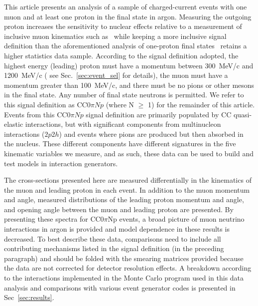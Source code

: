 \documentclass[%
twocolumn,
 amsmath,amssymb,
 aps,
prd,
superscriptaddress,showpacs]{revtex4-2}
\begin{document}
This article presents an analysis of a sample of charged-current events with one muon and at least one proton in the final state in argon.
Measuring the outgoing proton increases the sensitivity to nuclear effects relative to a measurement of inclusive muon kinematics such as~\cite{Adams:2019iqcINCL} while keeping a more inclusive signal definition than the aforementioned analysis of one-proton final states~\cite{uB_CCQE_2020} retains a higher statistics data sample. According to the signal definition adopted, the highest energy (leading) proton must have a momentum between 300~MeV/c and 1200~MeV/c (
see Sec.~\ref{sec:event_sel} for details), the muon must have a momentum greater than 100~MeV/c, and there must be no pions or other mesons in the final state.
Any number of final state neutrons is permitted.
We refer to this signal definition as CC$0\pi Np$ (where N $\ge$ 1) for the remainder of this article.
Events from this CC$0\pi Np$ signal definition are primarily populated by CC quasi-elastic interactions, but with significant components from multinucleon interactions ($2p2h$) and events where pions are produced but then absorbed in the nucleus.
These different components have different signatures in the five kinematic variables we measure, and as such, these data can be used to build and test models in interaction generators.

The cross-sections presented here are measured differentially in the kinematics of the muon and leading proton in each event.  
In addition to the muon momentum and angle, measured distributions of the leading proton momentum and angle, and opening angle between the muon and leading proton are presented.  
By presenting these spectra for CC0$\pi$Np events, a broad picture of muon neutrino interactions in argon is provided and model dependence in these results is decreased.
To best describe these data, comparisons need to include all contributing mechanisms listed in the signal definition (in the preceding paragraph) and should be folded with the smearing matrices provided because the data are not corrected for detector resolution effects.
A breakdown according to the interactions implemented in the Monte Carlo program used in this data analysis and comparisons with various event generator codes is presented in Sec~\ref{sec:results}.
\end{document}
